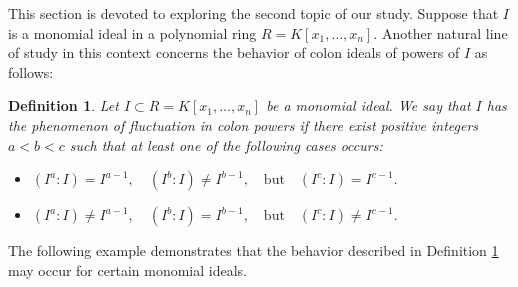 \documentclass[11pt]{amsart}
\newtheorem{definition}[theorem]{Definition}
\begin{document}
This section is devoted to exploring the second topic of our study.
 Suppose that $I$ is a monomial ideal in a polynomial ring $R = K[x_1, \ldots, x_n]$. 
Another natural line of study in this context  concerns the behavior of colon ideals of powers of $I$ as follows:  

\begin{definition} \label{Def. Fluctuation}
Let $I \subset R = K[x_1, \ldots, x_n]$ be a monomial ideal. We say that $I$ has the  phenomenon  of \textit{fluctuation in colon powers}
 if there exist  positive integers $a<b<c$ such that at least one of the following cases occurs:
\begin{itemize}
\item[(i)]  $(I^{a}:I) = I^{a-1}, \quad (I^{b}:I) \neq I^{b-1}, \quad \text{but} \quad (I^{c}:I) = I^{c-1}.$
\item[(ii)] $(I^{a}:I) \neq I^{a-1}, \quad (I^{b}:I) = I^{b-1}, \quad \text{but} \quad (I^{c}:I) \neq I^{c-1}.$
\end{itemize}
\end{definition}


The following example demonstrates  that the behavior described in Definition   \ref{Def. Fluctuation} may occur for certain monomial ideals.
\end{document}
